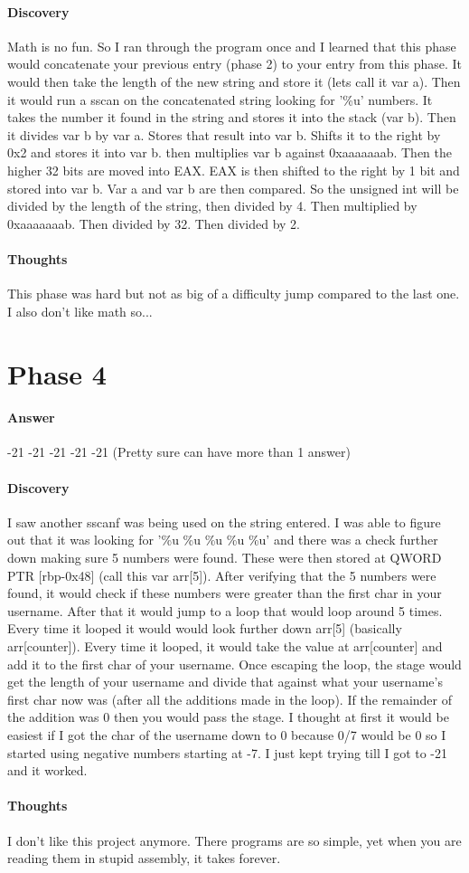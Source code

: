 \documentclass[12pt]{article}
\begin{document}
\paragraph{Discovery}
Math is no fun. So I ran through the program once and I learned that this phase would concatenate your previous entry (phase 2) to your entry from this phase. It would then take the length of the new string and store it (lets call it var a). Then it would run a sscan on the concatenated string looking for '\%u' numbers. It takes the number it found in the string and stores it into the stack (var b). Then it divides var b by var a. Stores that result into var b. Shifts it to the right by 0x2 and stores it into var b. then multiplies var b against 0xaaaaaaab. Then the higher 32 bits are moved into EAX. EAX is then shifted to the right by 1 bit and stored into var b. 
Var a and var b are then compared. 
So the unsigned int will be divided by the length of the string, then divided by 4. Then multiplied by 0xaaaaaaab. Then divided by 32. Then divided by 2.

\paragraph{Thoughts}
This phase was hard but not as big of a difficulty jump compared to the last one. I also don't like math so...

\section{Phase 4}
\paragraph{Answer}
-21 -21 -21 -21 -21 (Pretty sure can have more than 1 answer)

\paragraph{Discovery}
I saw another sscanf was being used on the string entered. I was able to figure out that it was looking for '\%u \%u \%u \%u \%u' and there was a check further down making sure 5 numbers were found. These were then stored at QWORD PTR [rbp-0x48] (call this var arr[5]). After verifying that the 5 numbers were found, it would check if these numbers were greater than the first char in your username. After that it would jump to a loop that would loop around 5 times. Every time it looped it would would look further down arr[5] (basically arr[counter]). Every time it looped, it would take the value at arr[counter] and add it to the first char of your username. Once escaping the loop, the stage would get the length of your username and divide that against what your username's first char now was (after all the additions made in the loop). If the remainder of the addition was 0 then you would pass the stage. 
I thought at first it would be easiest if I got the char of the username down to 0 because 0/7 would be 0 so I started using negative numbers starting at -7. I just kept trying till I got to -21 and it worked. 

\paragraph{Thoughts}
I don't like this project anymore. There programs are so simple, yet when you are reading them in stupid assembly, it takes forever.
\end{document}
